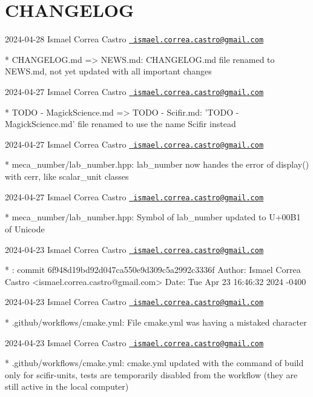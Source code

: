 \chapter{CHANGELOG}
\hypertarget{md_CHANGELOG}{}\label{md_CHANGELOG}
2024-\/04-\/28 Ismael Correa Castro \href{mailto:ismael.correa.castro@gmail.com}{\texttt{ ismael.\+correa.\+castro@gmail.\+com}} \begin{DoxyVerb}* CHANGELOG.md => NEWS.md: CHANGELOG.md file renamed to NEWS.md, not
yet updated with all important changes
\end{DoxyVerb}
 2024-\/04-\/27 Ismael Correa Castro \href{mailto:ismael.correa.castro@gmail.com}{\texttt{ ismael.\+correa.\+castro@gmail.\+com}} \begin{DoxyVerb}* TODO - MagickScience.md => TODO - Scifir.md: 'TODO -
MagickScience.md' file renamed to use the name Scifir instead
\end{DoxyVerb}
 2024-\/04-\/27 Ismael Correa Castro \href{mailto:ismael.correa.castro@gmail.com}{\texttt{ ismael.\+correa.\+castro@gmail.\+com}} \begin{DoxyVerb}* meca_number/lab_number.hpp: lab_number now handes the error of
display() with cerr, like scalar_unit classes
\end{DoxyVerb}
 2024-\/04-\/27 Ismael Correa Castro \href{mailto:ismael.correa.castro@gmail.com}{\texttt{ ismael.\+correa.\+castro@gmail.\+com}} \begin{DoxyVerb}* meca_number/lab_number.hpp: Symbol of lab_number updated to U+00B1
of Unicode
\end{DoxyVerb}
 2024-\/04-\/23 Ismael Correa Castro \href{mailto:ismael.correa.castro@gmail.com}{\texttt{ ismael.\+correa.\+castro@gmail.\+com}} \begin{DoxyVerb}* : commit 6f948d19bd92d047ca550e9d309c5a2992c3336f Author: Ismael
Correa Castro <ismael.correa.castro@gmail.com> Date:   Tue Apr 23
16:46:32 2024 -0400
\end{DoxyVerb}
 2024-\/04-\/23 Ismael Correa Castro \href{mailto:ismael.correa.castro@gmail.com}{\texttt{ ismael.\+correa.\+castro@gmail.\+com}} \begin{DoxyVerb}* .github/workflows/cmake.yml: File cmake.yml was having a mistaked
character
\end{DoxyVerb}
 2024-\/04-\/23 Ismael Correa Castro \href{mailto:ismael.correa.castro@gmail.com}{\texttt{ ismael.\+correa.\+castro@gmail.\+com}} \begin{DoxyVerb}* .github/workflows/cmake.yml: cmake.yml updated with the command of
build only for scifir-units, tests are temporarily disabled from the
workflow (they are still active in the local computer)
\end{DoxyVerb}
